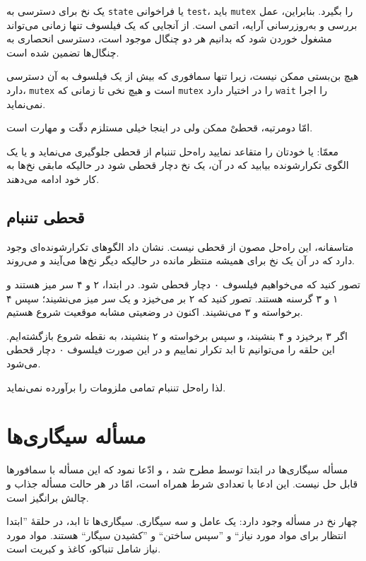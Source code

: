 \documentclass{book}
\newcommand{\clearemptydoublepage}{}%
\begin{document}
    یک نخ برای دسترسی به {\tt state} یا فراخوانی {\tt test}، باید {\tt mutex} را بگیرد. 
    بنابراین، عمل بررسی و به‌روزرسانی آرایه، اتمی است. از آنجایی که یک فیلسوف تنها زمانی می‌تواند 
    مشغول خوردن شود که بدانیم هر دو چنگال موجود است، 
    دسترسی انحصاری به چنگال‌ها تضمین شده است. 

    هیچ بن‌بستی ممکن نیست، زیرا تنها سمافوری که بیش از یک فیلسوف به آن دسترسی دارد، {\tt mutex} است و هیچ نخی  
    تا زمانی که {\tt mutex} را در اختیار دارد {\tt wait} را اجرا نمی‌نماید. 

    امّا دومرتبه، قحطیْ ممکن ولی در اینجا خیلی مستلزم دقّت و مهارت است.

    معمّا: یا خودتان را متقاعد نمایید راه‌حل تننبام از قحطی جلوگیری می‌نماید و یا یک الگوی تکرارشونده بیابید که در آن، 
    یک نخ دچار قحطی شود در حالیکه مابقی نخ‌ها به کار خود ادامه می‌دهند. 


\clearemptydoublepage
\subsection{قحطی تننبام}

    متاسفانه، این راه‌حل مصون از قحطی نیست.  نشان داد الگوهای تکرارشونده‌ای وجود دارد که 
    در آن یک نخ برای همیشه منتظر مانده در حالیکه دیگر نخ‌ها می‌آیند و می‌روند\cite{gingras90dining}.

    تصور کنید که می‌خواهیم فیلسوف ۰ دچار قحطی شود. در ابتدا، ۲ و ۴ سر میز هستند و ۱ و ۳ گرسنه هستند. 
    تصور کنید که ۲ بر می‌خیزد و یک سر میز می‌نشیند؛ 
    سپس ۴ برخواسته و ۳ می‌نشیند. اکنون در وضعیتی مشابه موقعیت شروع هستیم. 

    اگر ۳ برخیزد و ۴ بنشیند، و سپس  برخواسته و ۲ بنشیند، به نقطه شروع بازگشته‌ایم. 
    این  حلقه را می‌توانیم تا ابد تکرار نماییم و در این صورت فیلسوف ۰ دچار قحطی می‌شود. 

    لذا راه‌حل تننبام تمامی ملزومات را برآورده نمی‌نماید. 


\clearemptydoublepage
\section {مسأله سیگاری‌ها}

    مسأله سیگاری‌ها در ابتدا توسط      مطرح شد \cite{patil}، و ادّعا نمود که  این مسأله با سمافورها قابل حل نیست. 
    این ادعا با تعدادی شرط همراه است، امّا در هر حالت مسأله جذاب و چالش برانگیز است. 

    چهار نخ در مسأله وجود دارد: یک عامل و سه سیگاری. 
    سیگاری‌ها تا ابد، در حلقهٔ ''ابتدا انتظار برای مواد مورد نیاز`` 
    و ''سپس ساختن`` و ''کشیدن سیگار`` هستند.
    مواد مورد نیاز شامل تنباکو، کاغذ و کبریت است. 
\end{document}
